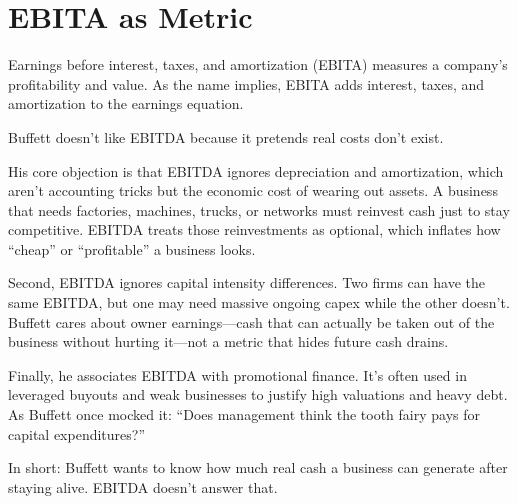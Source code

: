\section{EBITA as Metric}
Earnings before interest, taxes, and amortization (EBITA) measures a company's profitability and value. As the name implies, EBITA adds interest, taxes, and amortization to the earnings equation. 

Buffett doesn't like EBITDA because it pretends real costs don't exist.

His core objection is that EBITDA ignores depreciation and amortization, which aren't accounting tricks but the economic cost of wearing out assets. A business that needs factories, machines, trucks, or networks must reinvest cash just to stay competitive. EBITDA treats those reinvestments as optional, which inflates how ``cheap'' or ``profitable'' a business looks.

Second, EBITDA ignores capital intensity differences. Two firms can have the same EBITDA, but one may need massive ongoing capex while the other doesn’t. Buffett cares about owner earnings—cash that can actually be taken out of the business without hurting it—not a metric that hides future cash drains.

Finally, he associates EBITDA with promotional finance. It's often used in leveraged buyouts and weak businesses to justify high valuations and heavy debt. As Buffett once mocked it: ``Does management think the tooth fairy pays for capital expenditures?''

In short: Buffett wants to know how much real cash a business can generate after staying alive. EBITDA doesn’t answer that.